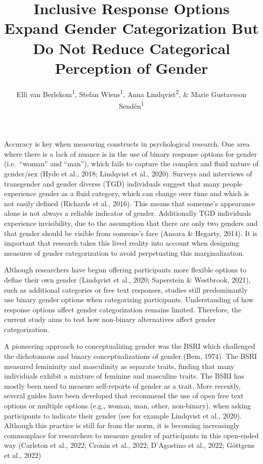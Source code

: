 \documentclass[
  man]{apa7}
\title{Inclusive Response Options Expand Gender Categorization But Do Not Reduce Categorical Perception of Gender}
\author{Elli van Berlekom\textsuperscript{1}, Stefan Wiens\textsuperscript{1}, Anna Lindqvist\textsuperscript{2}, \& Marie Gustavsson Sendén\textsuperscript{1}}
\date{}
\affiliation{\vspace{0.5cm}\textsuperscript{1} Stockholm University\\\textsuperscript{2} Lund University}
\begin{document}
\maketitle

Accuracy is key when measuring constructs in psychological research. One area where there is a lack of nuance is in the use of binary response options for gender (i.e.~``woman'' and ``man''), which fails to capture the complex and fluid nature of gender/sex (Hyde et al., 2018; Lindqvist et al., 2020). Surveys and interviews of transgender and gender diverse (TGD) individuals suggest that many people experience gender as a fluid category, which can change over time and which is not easily defined (Richards et al., 2016). This means that someone's appearance alone is not always a reliable indicator of gender. Additionally TGD individuals experience invisibility, due to the assumption that there are only two genders and that gender should be visible from someone's face (Ansara \& Hegarty, 2014). It is important that research takes this lived reality into account when designing measures of gender categorization to avoid perpetuating this marginalization.

Although researchers have begun offering participants more flexible options to define their own gender (Lindqvist et al., 2020; Saperstein \& Westbrook, 2021), such as additional categories or free text responses, studies still predominantly use binary gender options when categorizing participants. Understanding of how response options affect gender categorization remains limited. Therefore, the current study aims to test how non-binary alternatives affect gender categorization.

A pioneering approach to conceptualizing gender was the BSRI which challenged the dichotomous and binary conceptualizations of gender (Bem, 1974). The BSRI measured femininity and masculinity as separate traits, finding that many individuals exhibit a mixture of feminine and masculine traits. The BSRI has mostly been used to measure self-reports of gender as a trait. More recently, several guides have been developed that recommend the use of open free text options or multiple options (e.g., woman, man, other, non-binary). when asking participants to indicate their gender (see for example Lindqvist et al., 2020). Although this practice is still far from the norm, it is becoming increasingly commonplace for researchers to measure gender of participants in this open-ended way (Carleton et al., 2022; Cronin et al., 2022; D'Agostino et al., 2022; Göttgens et al., 2022)
\end{document}
